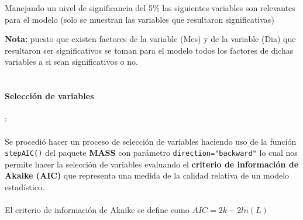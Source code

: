\documentclass[11pt,twoside]{article}
\begin{document}
\noindent Manejando un nivel de significancia del 5{\%}
las siguientes variables son relevantes para el modelo (solo se muestran las variables que resultaron significativas)


\begin{table}[H]
\caption{\small{Resumen del modelo1 estimado y valor-p}}
	\label{tabla1}
\end{table}
\noindent
\textbf{Nota:} puesto que existen factores de la variable (Mes) y de la variable (Dia) que resultaron ser significativos se toman para el modelo todos los factores de dichas variables a si sean significativos o no.
\\
\\


\paragraph{Selección de variables}:\\
\\
\noindent
Se procedió hacer un proceso de selección de variables haciendo uso de la función \texttt{stepAIC()} del paquete \textbf{MASS} con parámetro \texttt{direction="backward"} lo cual nos permite hacer la selección de variables evaluando el \textbf{criterio de información de Akaike (AIC)} que representa una medida de la calidad relativa de un modelo estadístico.
\\
\\
El criterio de información de Akaike se define como $AIC=2k-2ln(L)$ \\
\end{document}
